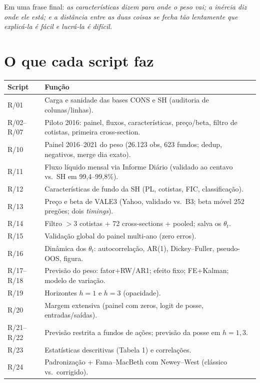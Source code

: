 \documentclass[11pt,a4paper]{article}
\begin{document}
Em uma frase final: \emph{as características dizem para onde o peso vai; a inércia diz onde ele
está; e a distância entre as duas coisas se fecha tão lentamente que explicá-la é fácil e
lucrá-la é difícil.}

\appendix
\section{O que cada script faz}

\begin{center}\small
\begin{tabular}{@{}lp{11.6cm}@{}}
\toprule
Script & Função \\
\midrule
R/01 & Carga e sanidade das bases CONS e SH (auditoria de colunas/linhas). \\
R/02--R/07 & Piloto 2016: painel, fluxos, características, preço/beta, filtro de cotistas, primeira cross-section. \\
R/10 & Painel 2016--2021 do peso (26.123 obs, 623 fundos; dedup, negativos, merge dia exato). \\
R/11 & Fluxo líquido mensal via Informe Diário (validado ao centavo vs.\ SH em 99{,}4--99{,}8\%). \\
R/12 & Características de fundo da SH (PL, cotistas, FIC, classificação). \\
R/13 & Preço e beta de VALE3 (Yahoo, validado vs.\ B3; beta móvel 252 pregões; dois \emph{timings}). \\
R/14 & Filtro $>3$ cotistas + 72 cross-sections + pooled; salva os $\theta_t$. \\
R/15 & Validação global do painel multi-ano (zero erros). \\
R/16 & Dinâmica dos $\theta_t$: autocorrelação, AR(1), Dickey--Fuller, pseudo-OOS, figura. \\
R/17--R/18 & Previsão do peso: fator+RW/AR1; efeito fixo; FE+Kalman; modelo de variação. \\
R/19 & Horizontes $h=1$ e $h=3$ (opacidade). \\
R/20 & Margem extensiva (painel com zeros, logit de posse, entradas/saídas). \\
R/21--R/22 & Previsão restrita a fundos de ações; previsão da posse em $h=1,3$. \\
R/23 & Estatísticas descritivas (Tabela 1) e correlações. \\
R/24 & Padronização + Fama--MacBeth com Newey--West (clássico vs.\ corrigido). \\

\end{tabular}
\end{center}
\end{document}
